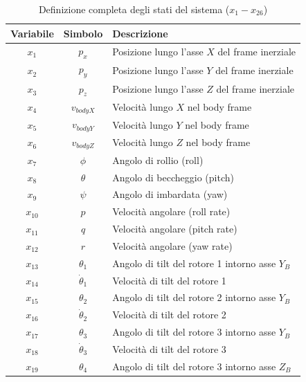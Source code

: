 \begin{table}[htbp]
    \centering
    \small %
    \caption{Definizione completa degli stati del sistema ($x_1 - x_{26}$)}
    \label{tab:stati_completi}
    \begin{tabular}{ccl}
        \toprule
        \textbf{Variabile} & \textbf{Simbolo} & \textbf{Descrizione} \\
        \midrule
        $x_1$ & $p_x$ & Posizione lungo l'asse $X$ del frame inerziale \\
        $x_2$ & $p_y$ & Posizione lungo l'asse $Y$ del frame inerziale \\
        $x_3$ & $p_z$ & Posizione lungo l'asse $Z$ del frame inerziale \\
        $x_4$ & $v_{bodyX}$ & Velocità lungo $X$ nel body frame \\
        $x_5$ & $v_{bodyY}$ & Velocità lungo $Y$ nel body frame \\
        $x_6$ & $v_{bodyZ}$ & Velocità lungo $Z$ nel body frame \\
        \addlinespace
        $x_7$ & $\phi$ & Angolo di rollio (roll) \\
        $x_8$ & $\theta$ & Angolo di beccheggio (pitch) \\
        $x_9$ & $\psi$ & Angolo di imbardata (yaw) \\
        $x_{10}$ & $p$ & Velocità angolare (roll rate) \\
        $x_{11}$ & $q$ & Velocità angolare (pitch rate) \\
        $x_{12}$ & $r$ & Velocità angolare (yaw rate) \\
        \midrule
        $x_{13}$ & $\theta_1$ & Angolo di tilt del rotore 1 intorno asse $Y_B$ \\
        $x_{14}$ & $\dot{\theta}_1$ & Velocità di tilt del rotore 1 \\
        $x_{15}$ & $\theta_2$ & Angolo di tilt del rotore 2 intorno asse $Y_B$ \\
        $x_{16}$ & $\dot{\theta}_2$ & Velocità di tilt del rotore 2 \\
        $x_{17}$ & $\theta_3$ & Angolo di tilt del rotore 3 intorno asse $Y_B$ \\
        $x_{18}$ & $\dot{\theta}_3$ & Velocità di tilt del rotore 3 \\
        $x_{19}$ & $\theta_4$ & Angolo di tilt del rotore 3 intorno asse $Z_B$ \\

\end{tabular}
\end{table}
